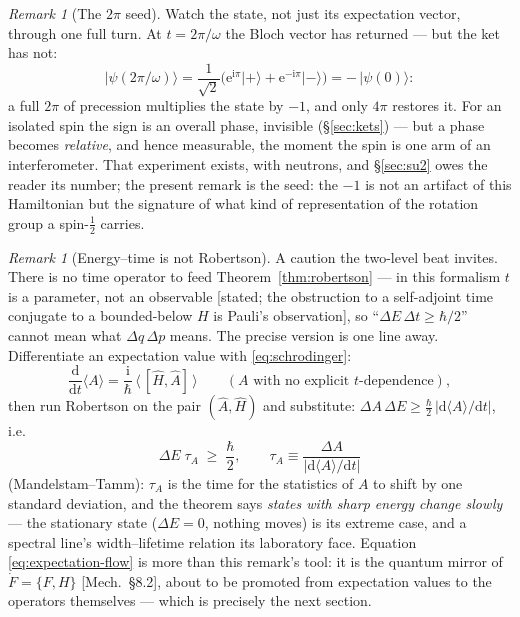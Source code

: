 \documentclass[11pt]{article}
\theoremstyle{plain}
\theoremstyle{definition}
\theoremstyle{remark}
\newtheorem{remark}[theorem]{Remark}
\newcommand{\dd}{\mathrm{d}}
\newcommand{\ee}{\mathrm{e}}
\newcommand{\ii}{\mathrm{i}}
\newcommand{\tot}[2]{\frac{\dd #1}{\dd #2}}
\newcommand{\op}[1]{\hat{#1}}
\newcommand{\ket}[1]{\lvert #1 \rangle}
\begin{document}
\begin{remark}[The $2\pi$ seed]\label{rem:2pi-seed}
Watch the state, not just its expectation vector, through one full
turn. At $t = 2\pi/\omega$ the Bloch vector has returned --- but the
ket has not:
\begin{equation}
  \ket{\psi(2\pi/\omega)}
  = \frac{1}{\sqrt2}\bigl(
      \ee^{\ii\pi}\ket+ + \ee^{-\ii\pi}\ket-
    \bigr)
  = -\,\ket{\psi(0)} :
\end{equation}
a full $2\pi$ of precession multiplies the state by $-1$, and only
$4\pi$ restores it. For an isolated spin the sign is an overall
phase, invisible (\S\ref{sec:kets}) --- but a phase becomes
\emph{relative}, and hence measurable, the moment the spin is one
arm of an interferometer. That experiment exists, with neutrons, and
\S\ref{sec:su2} owes the reader its number; the present remark is
the seed: the $-1$ is not an artifact of this Hamiltonian but the
signature of what kind of representation of the rotation group a
spin-$\tfrac12$ carries.
\end{remark}

\begin{remark}[Energy--time is not Robertson]
\label{rem:energy-time}
A caution the two-level beat invites. There is no time operator to
feed Theorem~\ref{thm:robertson} --- in this formalism $t$ is a
parameter, not an observable [stated; the obstruction to a
self-adjoint time conjugate to a bounded-below $H$ is Pauli's
observation], so ``$\Delta E\,\Delta t \ge \hbar/2$'' cannot mean
what $\Delta q\,\Delta p$ means. The precise version is one line
away. Differentiate an expectation value with
\eqref{eq:schrodinger}:
\begin{equation}
  \tot{}{t}\langle A\rangle
  = \frac{\ii}{\hbar}\,
    \bigl\langle\,[\op H, \op A]\,\bigr\rangle
  \qquad(\text{$A$ with no explicit $t$-dependence}),
  \label{eq:expectation-flow}
\end{equation}
then run Robertson on the pair $(\op A, \op H)$ and substitute:
$\Delta A\,\Delta E \ge \tfrac\hbar2\,|\dd\langle A\rangle/\dd t|$,
i.e.
\begin{equation}
  \Delta E\;\tau_A \;\ge\; \frac{\hbar}{2},
  \qquad
  \tau_A \equiv
  \frac{\Delta A}{\bigl|\dd\langle A\rangle/\dd t\bigr|}
  \label{eq:mandelstam-tamm}
\end{equation}
(Mandelstam--Tamm): $\tau_A$ is the time for the statistics of $A$
to shift by one standard deviation, and the theorem says
\emph{states with sharp energy change slowly} --- the stationary
state ($\Delta E = 0$, nothing moves) is its extreme case, and a
spectral line's width--lifetime relation its laboratory face.
Equation \eqref{eq:expectation-flow} is more than this remark's
tool: it is the quantum mirror of $\dot F = \{F, H\}$ [Mech.\ \S8.2],
about to be promoted from expectation values to the operators
themselves --- which is precisely the next section.
\end{remark}
\end{document}

